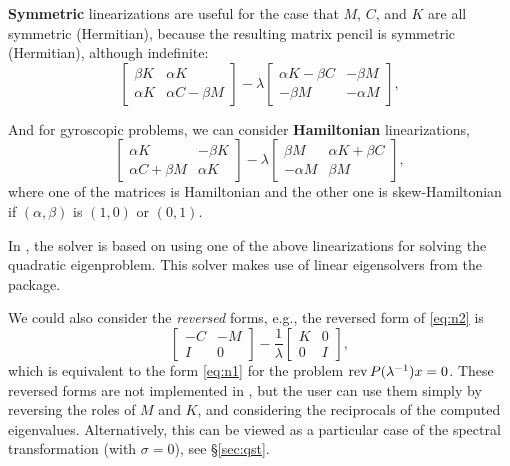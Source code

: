\textbf{Symmetric} linearizations are useful for the case that $M$, $C$, and $K$ are all symmetric (Hermitian), because the resulting matrix pencil is symmetric (Hermitian), although indefinite:
\begin{equation}
\label{eq:linsym}
\begin{bmatrix}\beta K&\alpha K\\\alpha K&\alpha C-\beta M\end{bmatrix}-\lambda\begin{bmatrix}\alpha K-\beta C&-\beta M\\-\beta M&-\alpha M\end{bmatrix},
\end{equation}

And for gyroscopic problems, we can consider \textbf{Hamiltonian} linearizations,
\begin{equation}
\label{eq:linham}
\begin{bmatrix}\alpha K & -\beta K\\\alpha C+\beta M & \alpha K\end{bmatrix}-\lambda\begin{bmatrix}\beta M & \alpha K+\beta C\\-\alpha M & \beta M\end{bmatrix},
\end{equation}
 where one of the matrices is Hamiltonian and the other one is skew-Hamiltonian if $(\alpha,\beta)$ is $(1,0)$ or $(0,1)$.

In \slepc, the  solver is based on using one of the above linearizations for solving the quadratic eigenproblem. This solver makes use of linear eigensolvers from the  package.

We could also consider the \emph{reversed} forms, e.g., the reversed form of \eqref{eq:n2} is
\begin{equation}
\label{eq:n2r}
\begin{bmatrix}-C & -M\\I & 0\end{bmatrix}-\frac{1}{\lambda}\begin{bmatrix}K & 0\\0 & I\end{bmatrix},
\end{equation}
which is equivalent to the form \eqref{eq:n1} for the problem $\operatorname{rev} P(\lambda^{-1})x=0$. These reversed forms are not implemented in \slepc, but the user can use them simply by reversing the roles of $M$ and $K$, and considering the reciprocals of the computed eigenvalues. Alternatively, this can be viewed as a particular case of the spectral transformation (with $\sigma=0$), see \S\ref{sec:qst}.

